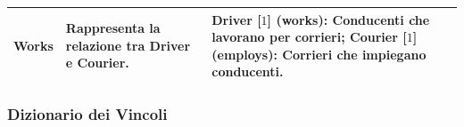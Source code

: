 \begin{tabularx}{\textwidth}{YYY}
  Works &
  \begin{minipage}[c]{\linewidth}
    \vspace{0.5cm}
    Rappresenta la relazione tra \textbf{Driver} e \textbf{Courier}. \newline
  \end{minipage} &
  \begin{minipage}[c]{\linewidth}
    \vspace{0.5cm}
    \textbf{Driver} [\(1\)]  (works): Conducenti che lavorano per corrieri; \newline
    \textbf{Courier} [\(1\)] (employs): Corrieri che impiegano conducenti. \newline
  \end{minipage} \\
  \bottomrule
\end{tabularx}

\subsubsection{Dizionario dei Vincoli}

